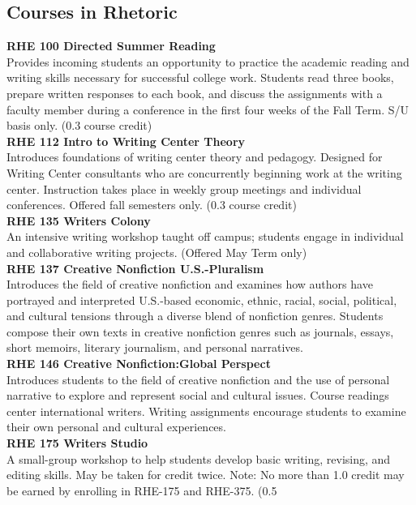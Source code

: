 \documentclass[
  letterpaper,
]{scrbook}
\begin{document}
\subsection{Courses in Rhetoric}\label{sec-courses-in-rhetoric}

\textbf{RHE 100 Directed Summer Reading}\\
Provides incoming students an opportunity to practice the academic
reading and writing skills necessary for successful college work.
Students read three books, prepare written responses to each book, and
discuss the assignments with a faculty member during a conference in the
first four weeks of the Fall Term. S/U basis only. (0.3 course credit)\\
\textbf{RHE 112 Intro to Writing Center Theory}\\
Introduces foundations of writing center theory and pedagogy. Designed
for Writing Center consultants who are concurrently beginning work at
the writing center. Instruction takes place in weekly group meetings and
individual conferences. Offered fall semesters only. (0.3 course
credit)\\
\textbf{RHE 135 Writers Colony}\\
An intensive writing workshop taught off campus; students engage in
individual and collaborative writing projects. (Offered May Term only)\\
\textbf{RHE 137 Creative Nonfiction U.S.-Pluralism}\\
Introduces the field of creative nonfiction and examines how authors
have portrayed and interpreted U.S.-based economic, ethnic, racial,
social, political, and cultural tensions through a diverse blend of
nonfiction genres. Students compose their own texts in creative
nonfiction genres such as journals, essays, short memoirs, literary
journalism, and personal narratives.\\
\textbf{RHE 146 Creative Nonfiction:Global Perspect}\\
Introduces students to the field of creative nonfiction and the use of
personal narrative to explore and represent social and cultural issues.
Course readings center international writers. Writing assignments
encourage students to examine their own personal and cultural
experiences.\\
\textbf{RHE 175 Writers Studio}\\
A small-group workshop to help students develop basic writing, revising,
and editing skills. May be taken for credit twice. Note: No more than
1.0 credit may be earned by enrolling in RHE-175 and RHE-375. (0.5
\end{document}
